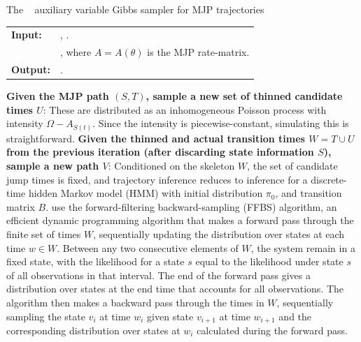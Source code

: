 \begin{algorithm}[H]
  \caption{The {\algname}~\cite{RaoTeh13} auxiliary variable Gibbs sampler for MJP trajectories}
   \label{alg:Unif_gibbs}
  \begin{tabular}{l l}
   \textbf{Input:  } & \text{MJP parameters $\theta$, $\pi_0$, observations $X$}, 
                       \text{the previous path $S(t) = (S, T)$}.\\ 
                     & \text{A  parameter $\Omega > \max_i A_i$}, where
   $A = A(\theta)$ is the MJP rate-matrix.\\
   \textbf{Output:  }& \text{A new MJP trajectory $S' (t) = (S', T')$}.\\
   \hline
   \end{tabular}
   \begin{algorithmic}[1]
\State \textbf{Given the MJP path $(S,T)$, sample a new set of thinned 
candidate times $U$}: %
These are distributed as an inhomogeneous Poisson process with intensity 
$\Omega-A_{S(t)}$. Since the intensity is piecewise-constant, simulating 
this is straightforward.
\State \textbf{Given the thinned and actual transition times $W = T \cup U$
from the previous iteration (after discarding state information $S$), 
sample a new path $V$}:
    Conditioned on the skeleton $W$, the set of candidate jump
    times is fixed, and trajectory inference reduces to inference for
    a discrete-time hidden Markov model (HMM) with initial distribution
    $\pi_0$, and transition matrix $B$. \cite{RaoTeh13} use the forward-filtering
    backward-sampling (FFBS) algorithm, an efficient dynamic 
    programming algorithm that makes a forward pass through the
    finite set of times $W$, sequentially updating the 
    distribution over states at each time $w \in W$. 
    Between any two consecutive elements of $W$,
    the system remain in a fixed state, with the likelihood for a state $s$ equal
    to the likelihood under state $s$ of all observations 
    in that interval. 
    The end of the forward pass gives a distribution over states at the
    end time that accounts for all observations.
    The algorithm then makes a backward pass through the times in $W$, 
    sequentially sampling the state $v_i$ at time $w_i$ given state 
    $v_{i+1}$  at 
    time $w_{i+1}$ and the corresponding distribution over states 
    at $w_i$ calculated during the
    forward pass. 
\end{algorithmic}
\end{algorithm}


